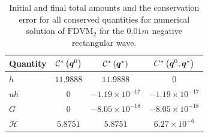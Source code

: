 \begin{table}
	\centering
	\begin{tabular}{l  c  c c}
		Quantity& $\mathcal{C}^*\left(\boldsymbol{q}^0\right)$ & $\mathcal{C}^*\left(\boldsymbol{q}^*\right)$ & ${C}^*\left(\boldsymbol{q}^0,\boldsymbol{q}^*\right)$ \B \\
		\hline
		$h$ & $11.9888$ & $11.9888$ & $0$ \T\\
		$uh$ & $0$ & $-1.19 \times 10^{-17}$ & $-1.19 \times 10^{-17}$\\
		$G$ & $0$ & $-8.05\times 10^{-18}$ & $-8.05\times 10^{-18}$\\
		$\mathcal{H}$ & $5.8751$ & $5.8751$ & $6.27 \times 10^{-6}$ \B\\
		\hline
	\end{tabular}
	\caption{Initial and final total amounts and the conservation error for all conserved quantities for numerical solution of $\text{FDVM}_2$ for the $0.01m$ negative rectangular wave.}
	\label{tab:ConservationSegurFDVM1cm}
\end{table}  
 

